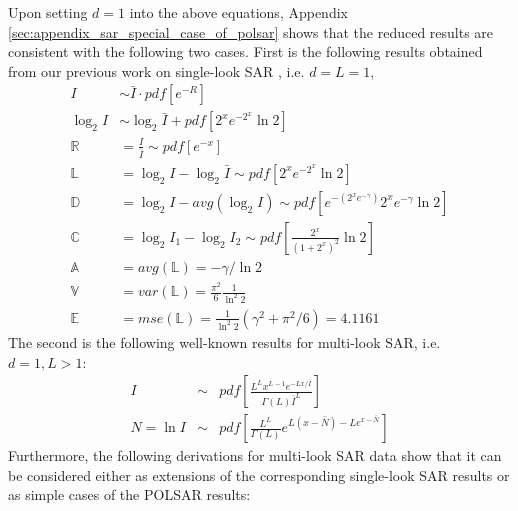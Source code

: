 \documentclass[journal]{IEEEtran}
\begin{document}
Upon setting $d=1$ into the above equations,
  Appendix \ref{sec:appendix_sar_special_case_of_polsar} shows that the reduced results are consistent with the following two cases.
First is the following results obtained from our previous work on single-look SAR \cite{Le_2010_ACRS} , i.e. $d=L=1$,
\begin{align*}
  I &\sim \bar{I} \cdot pdf \left[ e^{-R} \right] \\
  \log_2{I} &\sim \log_2{\bar{I}} + pdf \left[ 2^xe^{-2^x}\ln2 \right] \\
  \mathbb{R} &= \frac{I}{\bar{I}} \sim pdf \left[ e^{-x} \right]  \\
  \mathbb{L} &= \log_2{I} - \log_2{\bar{I}} \sim pdf \left[ 2^xe^{-2^x}\ln2 \right]\\
  \mathbb{D} &= \log_2{I} - avg(\log_2{I}) \sim pdf \left[ e^{-(2^xe^{-\gamma})} 2^xe^{-\gamma} \ln2 \right] \\
  \mathbb{C} &= \log_2{I_1} - \log_2{I_2} \sim pdf \left[ \frac{2^x}{(1+2^x)^2} \ln2 \right] \\
  \mathbb{A} &= avg(\mathbb{L}) = -\gamma / \ln{2} \\
  \mathbb{V} &= var(\mathbb{L}) = \frac{\pi^2}{6} \frac{1}{ \ln^2{2}} \\
  \mathbb{E} &= mse(\mathbb{L}) = \frac{1}{\ln^2{2}}( \gamma^2 + \pi^2/6 ) = 4.1161 
\end{align*}
The second is the following well-known results for multi-look SAR, i.e. $d=1,L>1$:
  \begin{eqnarray}
I &\sim& pdf \left[ \frac{L^L x^{L-1} e^{-Lx/\bar{I}}}{\Gamma(L) \bar{I}^L} \right] \\
N = \ln{I} &\sim& pdf \left[ \frac{L^L}{\Gamma(L)} e^{L(x-\bar{N})-Le^{x-\bar{N}}} \right]
  \end{eqnarray}
Furthermore, the following derivations for multi-look SAR data
   show that it can be considered 
    either as extensions of the corresponding single-look SAR results
    or as simple cases of the POLSAR results:
\end{document}
